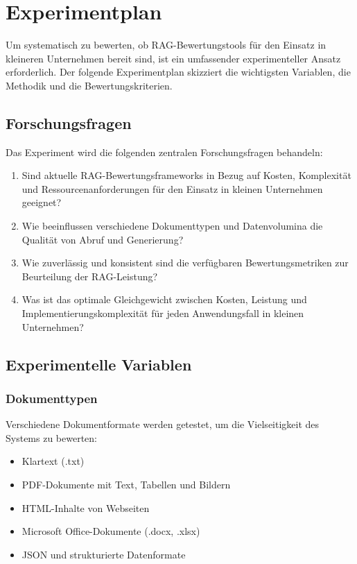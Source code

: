 \section{Experimentplan}

Um systematisch zu bewerten, ob RAG-Bewertungstools für den Einsatz in kleineren Unternehmen bereit sind, ist ein umfassender experimenteller Ansatz erforderlich. Der folgende Experimentplan skizziert die wichtigsten Variablen, die Methodik und die Bewertungskriterien.

\subsection{Forschungsfragen}

Das Experiment wird die folgenden zentralen Forschungsfragen behandeln:

\begin{enumerate}
    \item Sind aktuelle RAG-Bewertungsframeworks in Bezug auf Kosten, Komplexität und Ressourcenanforderungen für den Einsatz in kleinen Unternehmen geeignet?
    \item Wie beeinflussen verschiedene Dokumenttypen und Datenvolumina die Qualität von Abruf und Generierung?
    \item Wie zuverlässig und konsistent sind die verfügbaren Bewertungsmetriken zur Beurteilung der RAG-Leistung?
    \item Was ist das optimale Gleichgewicht zwischen Kosten, Leistung und Implementierungskomplexität für jeden Anwendungsfall in kleinen Unternehmen?
\end{enumerate}

\subsection{Experimentelle Variablen}

\subsubsection{Dokumenttypen}
Verschiedene Dokumentformate werden getestet, um die Vielseitigkeit des Systems zu bewerten:
\begin{itemize}
    \item Klartext (.txt)
    \item PDF-Dokumente mit Text, Tabellen und Bildern
    \item HTML-Inhalte von Webseiten
    \item Microsoft Office-Dokumente (.docx, .xlsx)
    \item JSON und strukturierte Datenformate
\end{itemize}

